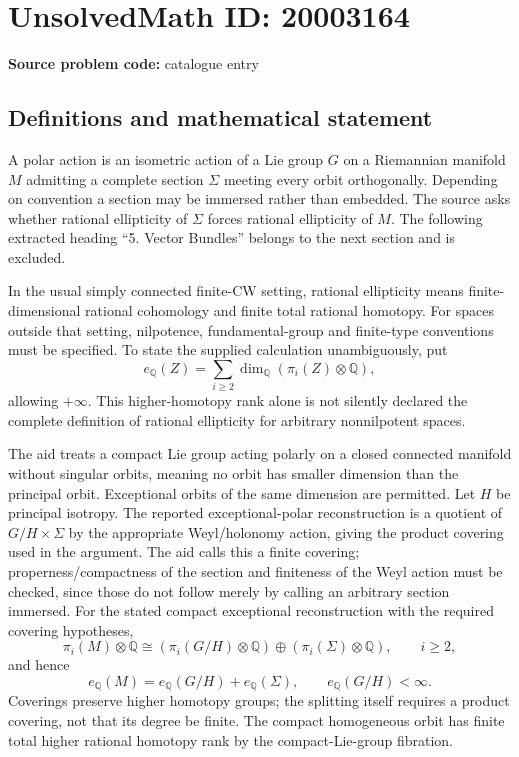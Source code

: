 \documentclass[11pt]{article}
\newcommand{\Q}{\mathbb{Q}}
\begin{document}
\section*{UnsolvedMath ID: 20003164}
\textbf{Source problem code:} catalogue entry
\subsection{Definitions and mathematical statement}
A polar action is an isometric action of a Lie group \(G\) on a Riemannian manifold \(M\) admitting a complete section \(\Sigma\) meeting every orbit orthogonally. Depending on convention a section may be immersed rather than embedded. The source asks whether rational ellipticity of \(\Sigma\) forces rational ellipticity of \(M\). The following extracted heading ``5. Vector Bundles'' belongs to the next section and is excluded.

In the usual simply connected finite-CW setting, rational ellipticity means finite-dimensional rational cohomology and finite total rational homotopy. For spaces outside that setting, nilpotence, fundamental-group and finite-type conventions must be specified. To state the supplied calculation unambiguously, put
\[
e_\Q(Z)=\sum_{i\ge2}\dim_\Q(\pi_i(Z)\otimes\Q),
\]
allowing \(+\infty\). This higher-homotopy rank alone is not silently declared the complete definition of rational ellipticity for arbitrary nonnilpotent spaces.

The aid treats a compact Lie group acting polarly on a closed connected manifold without singular orbits, meaning no orbit has smaller dimension than the principal orbit. Exceptional orbits of the same dimension are permitted. Let \(H\) be principal isotropy. The reported exceptional-polar reconstruction is a quotient of \(G/H\times\Sigma\) by the appropriate Weyl/holonomy action, giving the product covering used in the argument. The aid calls this a finite covering; properness/compactness of the section and finiteness of the Weyl action must be checked, since those do not follow merely by calling an arbitrary section immersed. For the stated compact exceptional reconstruction with the required covering hypotheses,
\[
\pi_i(M)\otimes\Q\cong
(\pi_i(G/H)\otimes\Q)\oplus(\pi_i(\Sigma)\otimes\Q),\qquad i\ge2,
\]
and hence
\[
e_\Q(M)=e_\Q(G/H)+e_\Q(\Sigma),\qquad e_\Q(G/H)<\infty.
\]
Coverings preserve higher homotopy groups; the splitting itself requires a product covering, not that its degree be finite. The compact homogeneous orbit has finite total higher rational homotopy rank by the compact-Lie-group fibration.
\end{document}
